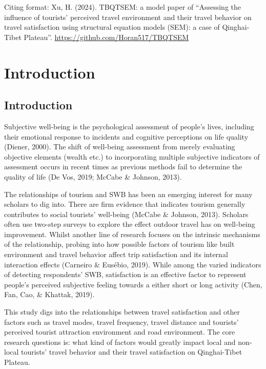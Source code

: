 \documentclass[
11pt, %
oneside, %
english, %
singlespacing, %
]{macthesis} %
\begin{document}
Citing format: Xu, H. (2024). TBQTSEM: a model paper of ``Assessing the influence of tourists' perceived travel environment and their travel behavior on travel satisfaction using structural equation models (SEM): a case of Qinghai-Tibet Plateau''. \url{https://github.com/Horan517/TBQTSEM}

\chapter{Introduction}\label{rmd-basics}

\section{Introduction}\label{introduction}

Subjective well-being is the psychological assessment of people's lives, including their emotional response to incidents and cognitive perceptions on life quality (Diener, 2000). The shift of well-being assessment from merely evaluating objective elements (wealth etc.) to incorporating multiple subjective indicators of assessment occurs in recent times as previous methods fail to determine the quality of life (De Vos, 2019; McCabe \& Johnson, 2013).

The relationships of tourism and SWB has been an emerging interest for many scholars to dig into. There are firm evidence that indicates tourism generally contributes to social tourists' well-being (McCabe \& Johnson, 2013). Scholars often use two-step surveys to explore the effect outdoor travel has on well-being improvement. Whilst another line of research focuses on the intrinsic mechanisms of the relationship, probing into how possible factors of tourism like built environment and travel behavior affect trip satisfaction and its internal interaction effects (Carneiro \& Eusébio, 2019). While among the varied indicators of detecting respondents' SWB, satisfaction is an effective factor to represent people's perceived subjective feeling towards a either short or long activity (Chen, Fan, Cao, \& Khattak, 2019).

This study digs into the relationships between travel satisfaction and other factors such as travel modes, travel frequency, travel distance and tourists' perceived tourist attraction environment and road environment. The core research questions is: what kind of factors would greatly impact local and non-local tourists' travel behavior and their travel satisfaction on Qinghai-Tibet Plateau.
\end{document}
